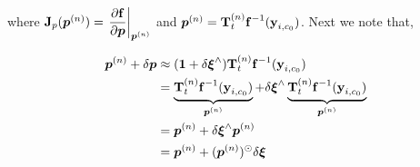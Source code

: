 where $\boldsymbol{\mathbf{J}}_p(\boldsymbol{p}^{(n)}) = \left.\dfrac{\partial \boldsymbol{\mathbf{f}}}{\partial \boldsymbol{p}}\right|_{\boldsymbol{p}^{(n)}}$ and $\boldsymbol{p}^{(n)} = \boldsymbol{\mathbf{T}}_t^{(n)} 
    \boldsymbol{\mathbf{f}}^{-1}(\boldsymbol{\mathbf{y}}_{i, c_0})$. Next we note that,

\begin{align}
	\boldsymbol{p}^{(n)} + \delta \boldsymbol{p} &\approx (\boldsymbol{\mathbf{1}} + \delta\boldsymbol{\mathbf{\xi}}^{\wedge}) \boldsymbol{\mathbf{T}}_t^{(n)} 
    \boldsymbol{\mathbf{f}}^{-1}( \boldsymbol{\mathbf{y}}_{i, c_0} ) \\
    &= \underbrace{\boldsymbol{\mathbf{T}}_t^{(n)} 
    \boldsymbol{\mathbf{f}}^{-1}(\boldsymbol{\mathbf{y}}_{i, c_0})}_{\boldsymbol{p}^{(n)}} + \delta\boldsymbol{\mathbf{\xi}}^{\wedge}\underbrace{\boldsymbol{\mathbf{T}}_t^{(n)} 
    \boldsymbol{\mathbf{f}}^{-1}(\boldsymbol{\mathbf{y}}_{i, c_0})}_{\boldsymbol{p}^{(n)}} \\
    &= \boldsymbol{p}^{(n)} + \delta\boldsymbol{\mathbf{\xi}}^{\wedge} \boldsymbol{p}^{(n)} \\
    &= \boldsymbol{p}^{(n)} + (\boldsymbol{p}^{(n)})^\odot \delta\boldsymbol{\mathbf{\xi}}
\end{align}


